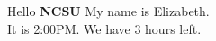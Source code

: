 \documentclass[11pt]{article}
\begin{document}
Hello \textbf{NCSU}
My name is Elizabeth.
\\It is 2:00PM.  We have 3 hours left.
\end{document}
